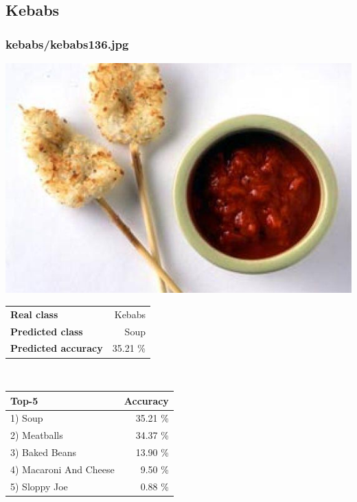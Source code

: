 \subsection{Kebabs}
    
\subsubsection{kebabs/kebabs136.jpg}

\begin{minipage}[t]{0.4\textwidth}
	\vspace{0pt}
	\includegraphics[width=\linewidth]{images/evaluation-images/kebabs/kebabs136.jpg}
\end{minipage}
\hfill
\begin{minipage}[t]{0.5\textwidth}
	\vspace{0pt}\raggedright
	\begin{tabularx}{\textwidth}{X r}
		\small \textbf{Real class} & \small Kebabs\\
		\small \textbf{Predicted class} & \small Soup\\
		\small \textbf{Predicted accuracy} & \small 35.21 \%
    \end{tabularx}\\
    
    \vspace{6pt}
	\begin{tabularx}{\textwidth}{X r}
        \small \textbf{Top-5} & \small \textbf{Accuracy} \\
        \hline
		\small 1) Soup & \small 35.21 \%\\\small 2) Meatballs & \small 34.37 \%\\\small 3) Baked Beans & \small 13.90 \%\\\small 4) Macaroni And Cheese & \small 9.50 \%\\\small 5) Sloppy Joe & \small 0.88 \%
    \end{tabularx}
\end{minipage}
    
